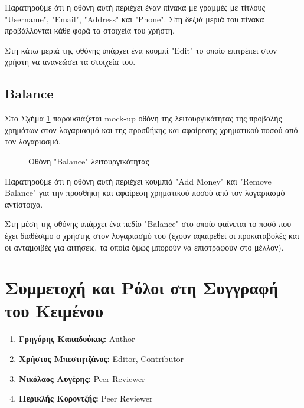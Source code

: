 \documentclass[12pt,a4paper]{article}
\begin{document}
Παρατηρούμε ότι η οθόνη αυτή περιέχει έναν πίνακα με γραμμές με τίτλους "Username", "Email", "Address" και "Phone". Στη δεξιά μεριά του πίνακα προβάλλονται κάθε φορά τα στοιχεία του χρήστη.

Στη κάτω μεριά της οθόνης υπάρχει ένα κουμπί "Edit" το οποίο επιτρέπει στον χρήστη να ανανεώσει τα στοιχεία του.

\subsection{Balance}

Στο Σχήμα \ref{Οθόνη "Balance" λειτουργικότητας} παρουσιάζεται mock-up οθόνη της λειτουργικότητας της προβολής χρημάτων στον λογαριασμό και της προσθήκης και αφαίρεσης χρηματικού ποσού από τον λογαριασμό.

\begin{figure}[H]
	\caption{Οθόνη "Balance" λειτουργικότητας}
	\label{Οθόνη "Balance" λειτουργικότητας}
\end{figure}

Παρατηρούμε ότι η οθόνη αυτή περιέχει κουμπιά "Add Money" και "Remove Balance" για την προσθήκη και αφαίρεση χρηματικού ποσού από τον λογαριασμό αντίστοιχα.

Στη μέση της οθόνης υπάρχει ένα πεδίο "Balance" στο οποίο φαίνεται το ποσό που έχει διαθέσιμο ο χρήστης στον λογαριασμό του (έχουν αφαιρεθεί οι προκαταβολές και οι ανταμοιβές για αιτήσεις, τα οποία όμως μπορούν να επιστραφούν στο μέλλον).

\section{Συμμετοχή και Ρόλοι στη Συγγραφή του Κειμένου}

\begin{enumerate}
	\item \textbf{Γρηγόρης Καπαδούκας:} Author
	\item \textbf{Χρήστος Μπεστητζάνος:} Editor, Contributor
	\item \textbf{Νικόλαος Αυγέρης:} Peer Reviewer
	\item \textbf{Περικλής Κοροντζής:} Peer Reviewer
\end{enumerate}
\end{document}
